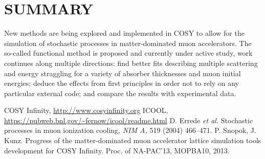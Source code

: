 \documentclass{jacow}
\begin{document}
\section{SUMMARY}
New methods are being explored and implemented in COSY to allow for the simulation of stochastic processes in matter-dominated muon accelerators. The so-called functional method is proposed and currently under active study, work continues along multiple directions: find better fits describing multiple scattering and energy straggling for a variety of absorber thicknesses and muon initial energies; deduce the effects from first principles in order not to rely on any particular external code; and compare the results with experimental data.

\begin{thebibliography}{9}   %
COSY Infinity, \url{http://www.cosyinfinity.org}
ICOOL, \url{https://pubweb.bnl.gov/~fernow/icool/readme.html}
D. Errede \emph{et al.} Stochastic processes in muon ionization cooling, \emph {NIM A,} 519 (2004) 466--471.
P. Snopok, J. Kunz. Progress of the matter-dominated muon accelerator lattice simulation tools development for COSY Infinity. Proc. of NA-PAC'13, MOPBA10, 2013.

\end{thebibliography}
\mbox{}
\end{document}
